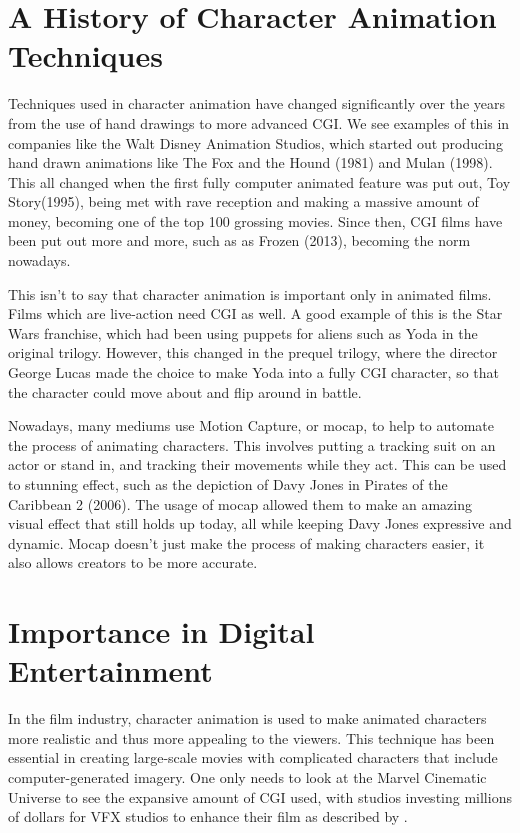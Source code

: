 \documentclass{l4proj}
\begin{document}
\section{A History of Character Animation Techniques}
Techniques used in character animation have changed significantly over the years from the use of hand drawings to more advanced CGI. We see examples of this in companies like the Walt Disney Animation Studios, which started out producing hand drawn animations like The Fox and the Hound (1981) and Mulan (1998). This all changed when the first fully computer animated feature was put out, Toy Story(1995), being met with rave reception and making a massive amount of money, becoming one of the top 100 grossing movies. Since then, CGI films have been put out more and more, such as as Frozen (2013), becoming the norm nowadays.

This isn't to say that character animation is important only in animated films. Films which are live-action need CGI as well. A good example of this is the Star Wars franchise, which had been using puppets for aliens such as Yoda in the original trilogy. However, this changed in the prequel trilogy, where the director George Lucas made the choice to make Yoda into a fully CGI character, so that the character could move about and flip around in battle.

Nowadays, many mediums use Motion Capture, or mocap, to help to automate the process of animating characters. This involves putting a tracking suit on an actor or stand in, and tracking their movements while they act. This can be used to stunning effect, such as the depiction of Davy Jones in Pirates of the Caribbean 2 (2006). The usage of mocap allowed them to make an amazing visual effect that still holds up today, all while keeping Davy Jones expressive and dynamic. Mocap doesn't just make the process of making characters easier, it also allows creators to be more accurate.
\clearpage
\section{Importance in Digital Entertainment}
In the film industry, character animation is used to make animated characters more realistic and thus more appealing to the viewers. This technique has been essential in creating large-scale movies with complicated characters that include computer-generated imagery. One only needs to look at the Marvel Cinematic Universe to see the expansive amount of CGI used, with studios investing millions of dollars for VFX studios to enhance their film as described by \cite{tina23}.
\end{document}
